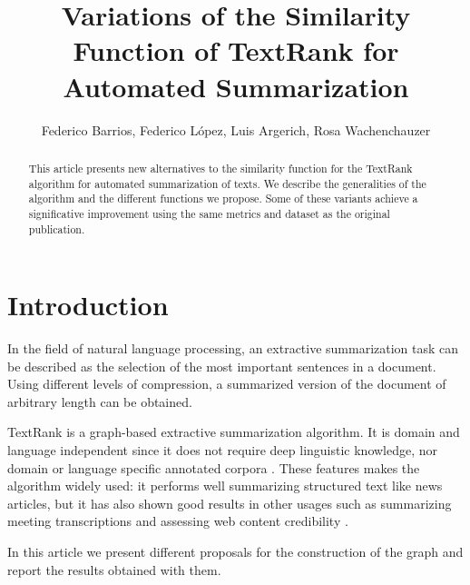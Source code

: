 \documentclass{llncs}
\begin{document}
\frontmatter

\title{Variations of the Similarity Function of TextRank for Automated Summarization}

\author{Federico Barrios, Federico López, Luis Argerich, Rosa Wachenchauzer}

\maketitle

\begin{abstract}
This article presents new alternatives to the similarity function for the TextRank algorithm for automated summarization of texts. We describe the generalities of the algorithm and the different functions we propose. Some of these variants achieve a significative improvement using the same metrics and dataset as the original publication. 

\end{abstract}

\section{Introduction}
In the field of natural language processing, an extractive summarization task can be described as the selection of the most important sentences in a document. Using different levels of compression, a summarized version of the document of arbitrary length can be obtained.

TextRank is a graph-based extractive summarization algorithm. It is domain and language independent since it does not require deep linguistic knowledge, nor domain or language specific annotated corpora \cite{mihalcea}. These features makes the algorithm widely used: it performs well summarizing structured text like news articles, but it has also shown good results in other usages such as summarizing meeting transcriptions \cite{garg} and assessing web content credibility \cite{balcerzak}.

In this article we present different proposals for the construction of the graph and report the results obtained with them.
\end{document}
